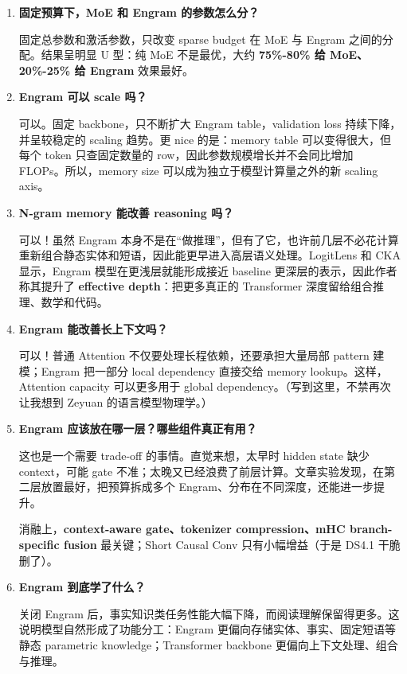 \documentclass[
  11pt,
  a4paper,
  fontset=none]{ctexart}
\begin{document}
\begin{enumerate}
\def\labelenumi{\arabic{enumi}.}
\item
  \textbf{固定预算下，MoE 和 Engram 的参数怎么分？}

  固定总参数和激活参数，只改变 sparse budget 在 MoE 与 Engram
  之间的分配。结果呈明显 U 型：纯 MoE 不是最优，大约 \textbf{75\%-80\%
  给 MoE、20\%-25\% 给 Engram} 效果最好。
\item
  \textbf{Engram 可以 scale 吗？}

  可以。固定 backbone，只不断扩大 Engram table，validation loss
  持续下降，并呈较稳定的 scaling 趋势。更 nice 的是：memory table
  可以变得很大，但每个 token 只查固定数量的
  row，因此参数规模增长并不会同比增加 FLOPs。所以，memory size
  可以成为独立于模型计算量之外的新 scaling axis。
\item
  \textbf{N-gram memory 能改善 reasoning 吗？}

  可以！虽然 Engram
  本身不是在``做推理''，但有了它，也许前几层不必花计算重新组合静态实体和短语，因此能更早进入高层语义处理。LogitLens
  和 CKA 显示，Engram 模型在更浅层就能形成接近 baseline
  更深层的表示，因此作者称其提升了 \textbf{effective
  depth}：把更多真正的 Transformer 深度留给组合推理、数学和代码。
\item
  \textbf{Engram 能改善长上下文吗？}

  可以！普通 Attention 不仅要处理长程依赖，还要承担大量局部 pattern
  建模；Engram 把一部分 local dependency 直接交给 memory
  lookup。这样，Attention capacity 可以更多用于 global
  dependency。（写到这里，不禁再次让我想到 Zeyuan 的语言模型物理学。）
\item
  \textbf{Engram 应该放在哪一层？哪些组件真正有用？}

  这也是一个需要 trade-off 的事情。直觉来想，太早时 hidden state 缺少
  context，可能 gate
  不准；太晚又已经浪费了前层计算。文章实验发现，在第二层放置最好，把预算拆成多个
  Engram、分布在不同深度，还能进一步提升。

  消融上，\textbf{context-aware gate、tokenizer compression、mHC
  branch-specific fusion} 最关键；Short Causal Conv 只有小幅增益（于是
  DS4.1 干脆删了）。
\item
  \textbf{Engram 到底学了什么？}

  关闭 Engram
  后，事实知识类任务性能大幅下降，而阅读理解保留得更多。这说明模型自然形成了功能分工：Engram
  更偏向存储实体、事实、固定短语等静态 parametric knowledge；Transformer
  backbone 更偏向上下文处理、组合与推理。
\end{enumerate}
\end{document}
